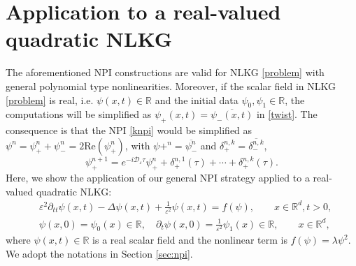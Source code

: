 \documentclass[final,leqno,showlabe]{siamltex}
\begin{document}
\section{Application to a real-valued quadratic NLKG}
\label{sec:qkg}
The aforementioned NPI constructions are valid for NLKG \eqref{problem} with general polynomial type nonlinearities. Moreover, if the scalar field in NLKG \eqref{problem} is real, i.e. $\psi(x,t)\in\mathbb{R}$ and the initial data $\psi_0,\psi_1\in\mathbb{R}$, the computations will be simplified as $\psi_+(x,t)=\overline{\psi_-(x,t)}$ in \eqref{twist}. The consequence is that the NPI \eqref{knpi} would be simplified as $\psi^n=\psi_+^n+\psi_-^n=2\text{Re}(\psi_+^n)$, with $\psi+^n=\overline{\psi_-^n}$ and $\delta_+^{n,k}=\overline{\delta_-^{n,k}}$,
\begin{equation}
\psi_+^{n+1}=e^{- i\mathcal{D}_\varepsilon \tau}\psi_+^{n}+\delta_{+}^{n,1}(\tau)+\cdots+\delta_{+}^{n,k}(\tau).\label{knpi-r}
\end{equation}
Here, we show the application of our general NPI strategy applied to a real-valued quadratic NLKG:
\begin{equation}\label{problem-r}
\begin{split}
&\varepsilon^2\partial_{tt}\psi(x,t)-\Delta\psi(x,t)+\frac{1}{\varepsilon^2}\psi(x,t)=f(\psi),\qquad x\in \mathbb{R}^d, t>0, \\
&\psi(x,0)=\psi_0(x)\in\mathbb{R},\quad \partial_t\psi(x,0)=\frac{1}{\varepsilon^2}\psi_1(x)\in\mathbb{R}, \qquad x\in \mathbb{R}^d,
\end{split}
\end{equation}
where $\psi(x,t)\in\mathbb{R}$ is a real scalar field and the nonlinear term is $f(\psi)=\lambda \psi^2$.
We adopt the notations in Section \ref{sec:npi}.
\end{document}
